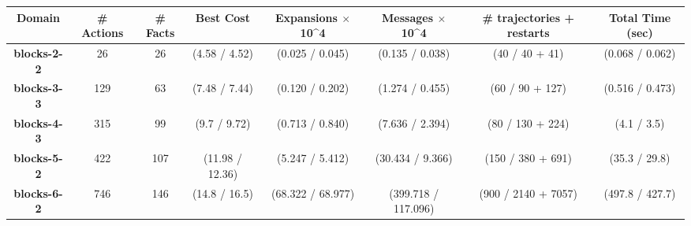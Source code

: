 \documentclass[letterpaper]{article} %
\theoremstyle{remark}
\begin{document}
\begin{table}[]
\centering
\scriptsize
\begin{tabular}{|c|c|c||c|c|c|c|c|}
\hline
\textbf{Domain}        & \textbf{\# Actions} & \textbf{\# Facts} & \textbf{Best Cost} & \textbf{Expansions $\times$ 10\textasciicircum{}4} & \textbf{Messages $\times$ 10\textasciicircum{}4} & \textbf{\# trajectories + restarts} & \textbf{Total Time (sec)} \\ \hline\hline
\textbf{blocks-2-2}    & 26                  & 26                & (4.58 / 4.52)      & (0.025 / 0.045)                             & (0.135 / 0.038)                           & (40 / 40 + 41)                & (0.068 / 0.062)           \\ \hline
\textbf{blocks-3-3}    & 129                 & 63                & (7.48 / 7.44)      & (0.120 / 0.202)                             & (1.274 / 0.455)                           & (60 / 90 + 127)                & (0.516 / 0.473)           \\ \hline
\textbf{blocks-4-3}    & 315                 & 99                & (9.7 / 9.72)       & (0.713 / 0.840)                             & (7.636 / 2.394)                           & (80 / 130 + 224)               & (4.1 / 3.5)               \\ \hline
\textbf{blocks-5-2}    & 422                 & 107               & (11.98 / 12.36)    & (5.247 / 5.412)                             & (30.434 / 9.366)                          & (150 / 380 + 691)              & (35.3 / 29.8)             \\ \hline
\textbf{blocks-6-2}    & 746                 & 146               & (14.8 / 16.5)      & (68.322 / 68.977)                           & (399.718 / 117.096)                       & (900 / 2140 + 7057)             & (497.8 / 427.7)           \\ \hline\hline

\end{tabular}
\end{table}
\end{document}
